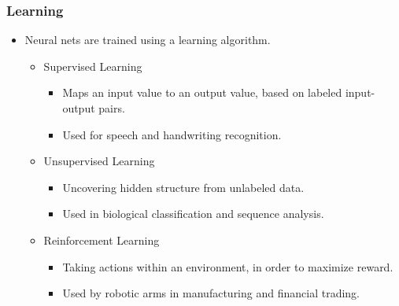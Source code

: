 \documentclass{beamer}
\begin{document}
   \begin{frame}
      \frametitle{Learning}
      \begin{itemize}
         \item Neural nets are trained using a learning algorithm.
            \begin{itemize}
               \item Supervised Learning
                  \begin{itemize}
                     \item Maps an input value to an output value, based on labeled input-output pairs.
                     \item Used for speech and handwriting recognition.
                  \end{itemize}
               \item Unsupervised Learning
                  \begin{itemize}
                     \item Uncovering hidden structure from unlabeled data.
                     \item Used in biological classification and sequence analysis.
                  \end{itemize}
               \item Reinforcement Learning
                  \begin{itemize}
                     \item Taking actions within an environment, in order to maximize reward.
                     \item Used by robotic arms in manufacturing and financial trading.
                  \end{itemize}
            \end{itemize}
      \end{itemize}
   \end{frame}
   
\end{document}
